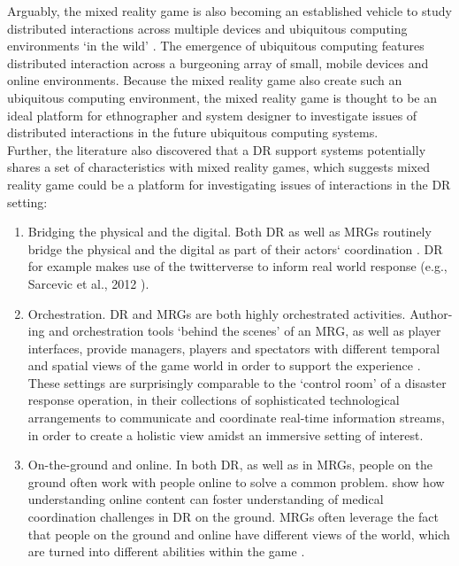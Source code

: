 Arguably, the mixed reality game is also becoming an established vehicle to study distributed interactions across multiple devices and ubiquitous computing environments `in the wild' \cite{Crabtree2006, Benford2005, Fischer2012}. The emergence of ubiquitous computing features distributed interaction across a burgeoning array of small, mobile devices and online environments. Because the mixed reality game also create such an ubiquitous computing environment,  the mixed reality game is thought to be an ideal platform for ethnographer and system designer to investigate issues of distributed interactions in the future ubiquitous computing systems.\\

Further, the literature \cite{Fischer2012} also discovered that a \ac{DR} support systems potentially shares a set of characteristics with mixed reality games, which suggests mixed reality game could be a platform for investigating issues of interactions in the DR setting:\\

\begin{enumerate}
\item Bridging the physical and the digital. Both \ac{DR} as well as \ac{MRG}s routinely bridge the physical and the digital as part of their actors` coordination \cite{Benford2005}. \ac{DR} for example makes use of the twitterverse to inform real world response (e.g., Sarcevic et al., 2012 \cite{Sarcevic2012}).

\item Orchestration. \ac{DR} and \ac{MRG}s are both highly orchestrated activities. Author-ing and orchestration tools `behind the scenes' of an \ac{MRG}, as well as player interfaces, provide managers, players and spectators with different temporal and spatial views of the game world in order to support the experience \cite{Crabtree2004}. These settings are surprisingly comparable to the `control room' of a disaster response operation, in their collections of sophisticated technological arrangements to communicate and coordinate real-time information streams, in order to create a holistic view amidst an immersive setting of interest.\\

\item On-the-ground and online. In both \ac{DR}, as well as in \ac{MRG}s, people on the ground often work with people online to solve a common problem. \cite{Sarcevic2012} show how understanding online content can foster understanding of medical coordination challenges in \ac{DR} on the ground. \ac{MRG}s often leverage the fact that people on the ground and online have different views of the world, which are turned into different abilities within the game \cite{Flintham2003}.\\ 

\end{enumerate}

